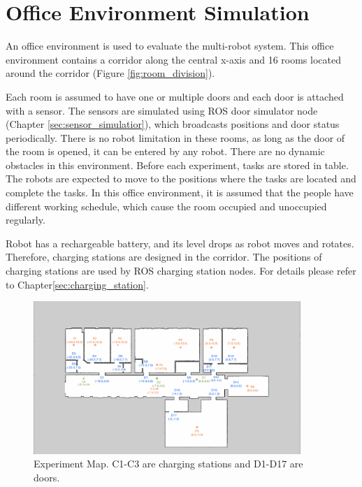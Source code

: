 


\section{Office Environment Simulation}
An office environment is used to evaluate the multi-robot system. This office environment contains a corridor along the central x-axis and 16 rooms located around the corridor (Figure \ref{fig:room_division}). 

Each room is assumed to have one or multiple doors and each door is attached with a sensor. The sensors are simulated using ROS door simulator node (Chapter \ref{sec:sensor_simulatior}), which broadcasts positions and door status periodically. There is no robot limitation in these rooms, as long as the door of the room is opened, it can be entered by any robot. 
There are no dynamic obstacles in this environment. Before each experiment, tasks are stored in table. The robots are expected to move to the positions where the tasks are located and complete the tasks.
In this office environment, it is assumed that the people have different working schedule, which cause the room occupied and unoccupied regularly. 

Robot has a rechargeable battery, and its level drops as robot moves and rotates. Therefore, charging stations are designed in the corridor. The positions of charging stations are used by ROS charging station nodes. For details please refer to Chapter\ref{sec:charging_station}.

\begin{figure}[htbp]
   \centering
   \includegraphics[width = 0.9\textwidth]{content/images/ch5/door_station_points.png}
   \caption{Experiment Map. C1-C3 are charging stations and D1-D17 are doors.}
   \label{fig:exp_map}
\end{figure}

